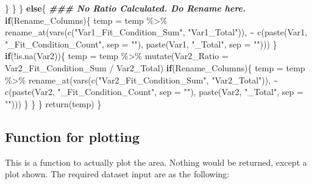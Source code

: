 \documentclass[
]{article}
\newenvironment{Shaded}{\begin{snugshade}}{\end{snugshade}}
\newcommand{\AttributeTok}[1]{\textcolor[rgb]{0.77,0.63,0.00}{#1}}
\newcommand{\ControlFlowTok}[1]{\textcolor[rgb]{0.13,0.29,0.53}{\textbf{#1}}}
\newcommand{\DocumentationTok}[1]{\textcolor[rgb]{0.56,0.35,0.01}{\textbf{\textit{#1}}}}
\newcommand{\FunctionTok}[1]{\textcolor[rgb]{0.00,0.00,0.00}{#1}}
\newcommand{\NormalTok}[1]{#1}
\newcommand{\OtherTok}[1]{\textcolor[rgb]{0.56,0.35,0.01}{#1}}
\newcommand{\SpecialCharTok}[1]{\textcolor[rgb]{0.00,0.00,0.00}{#1}}
\newcommand{\StringTok}[1]{\textcolor[rgb]{0.31,0.60,0.02}{#1}}
\begin{document}
\begin{Shaded}
\begin{Highlighting}[]
\NormalTok{      \}}
\NormalTok{    \}}
\NormalTok{  \}}
  \ControlFlowTok{else}\NormalTok{\{}
    \DocumentationTok{\#\#\# No Ratio Calculated. Do Rename here.}
    \ControlFlowTok{if}\NormalTok{(Rename\_Columns)\{}
\NormalTok{      temp }\OtherTok{=}\NormalTok{ temp }\SpecialCharTok{\%\textgreater{}\%} 
        \FunctionTok{rename\_at}\NormalTok{(}\FunctionTok{vars}\NormalTok{(}\FunctionTok{c}\NormalTok{(}\StringTok{"Var1\_Fit\_Condition\_Sum"}\NormalTok{, }\StringTok{"Var1\_Total"}\NormalTok{)), }
                  \SpecialCharTok{\textasciitilde{}} \FunctionTok{c}\NormalTok{(}\FunctionTok{paste}\NormalTok{(Var1, }\StringTok{"\_Fit\_Condition\_Count"}\NormalTok{, }\AttributeTok{sep =} \StringTok{""}\NormalTok{),}
                      \FunctionTok{paste}\NormalTok{(Var1, }\StringTok{"\_Total"}\NormalTok{, }\AttributeTok{sep =} \StringTok{""}\NormalTok{)))}
\NormalTok{    \}}
    \ControlFlowTok{if}\NormalTok{(}\SpecialCharTok{!}\FunctionTok{is.na}\NormalTok{(Var2))\{}
\NormalTok{      temp }\OtherTok{=}\NormalTok{ temp }\SpecialCharTok{\%\textgreater{}\%} \FunctionTok{mutate}\NormalTok{(}\AttributeTok{Var2\_Ratio =}\NormalTok{ Var2\_Fit\_Condition\_Sum }\SpecialCharTok{/}\NormalTok{ Var2\_Total)}
      \ControlFlowTok{if}\NormalTok{(Rename\_Columns)\{}
\NormalTok{        temp }\OtherTok{=}\NormalTok{ temp }\SpecialCharTok{\%\textgreater{}\%} 
          \FunctionTok{rename\_at}\NormalTok{(}\FunctionTok{vars}\NormalTok{(}\FunctionTok{c}\NormalTok{(}\StringTok{"Var2\_Fit\_Condition\_Sum"}\NormalTok{, }\StringTok{"Var2\_Total"}\NormalTok{)), }
                    \SpecialCharTok{\textasciitilde{}} \FunctionTok{c}\NormalTok{(}\FunctionTok{paste}\NormalTok{(Var2, }\StringTok{"\_Fit\_Condition\_Count"}\NormalTok{, }\AttributeTok{sep =} \StringTok{""}\NormalTok{),}
                        \FunctionTok{paste}\NormalTok{(Var2, }\StringTok{"\_Total"}\NormalTok{, }\AttributeTok{sep =} \StringTok{""}\NormalTok{)))}
\NormalTok{      \}}
\NormalTok{    \}}
\NormalTok{  \}}
  \FunctionTok{return}\NormalTok{(temp)}
\NormalTok{\}}
\end{Highlighting}
\end{Shaded}

\hypertarget{function-for-plotting}{%
\subsection{Function for plotting}\label{function-for-plotting}}

This is a function to actually plot the area. Nothing would be returned,
except a plot shown. The required dataset input are as the following:
\end{document}
